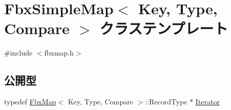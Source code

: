 \hypertarget{class_fbx_simple_map}{}\section{Fbx\+Simple\+Map$<$ Key, Type, Compare $>$ クラステンプレート}
\label{class_fbx_simple_map}


{\ttfamily \#include $<$fbxmap.\+h$>$}

\subsection*{公開型}
\begin{DoxyCompactItemize}
\item 
typedef \hyperlink{class_fbx_map}{Fbx\+Map}$<$ Key, Type, Compare $>$\+::Record\+Type $\ast$ \hyperlink{class_fbx_simple_map_aaa589eb5e1ccdd11dffd018f3212e13e}{Iterator}
\end{DoxyCompactItemize}
